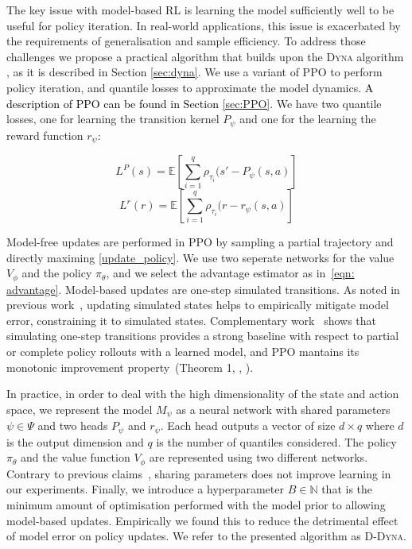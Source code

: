 \documentclass{article}
\begin{document}
        The key issue with model-based RL is learning the model sufficiently well to be useful for policy iteration. In real-world applications, this issue is exacerbated by the requirements of generalisation and sample efficiency. To address those challenges we propose a practical algorithm that builds upon the \textsc{Dyna} algorithm \cite{sutton2012dyna}, as it is described in Section \ref{sec:dyna}.
        We use a variant of PPO \cite{Schulman2017} to perform policy iteration, and quantile losses to approximate the model dynamics. \textcolor{black}{A description of PPO can be found in Section \ref{sec:PPO}}. We have two quantile losses, one for learning the transition kernel $P_\psi$ and one for the learning the reward function $r_\psi$:
       
        \begin{equation}
        	L^P(s) = \mathbb{E}[\sum_{i=1}^q \rho_{\tau_i}(s' - P_\psi(s,a)] 
        \end{equation}
        \begin{equation}
        	L^r(r) = \mathbb{E}[\sum_{i=1}^q \rho_{\tau_i}(r - r_\psi(s,a)]
        \end{equation}
        
        Model-free updates are performed in PPO by sampling a partial trajectory and directly maximing {\eqref{update_policy}}. %
        We use two seperate networks for the value $V_\phi$ and the policy $\pi_\theta$, and we select the advantage estimator as in~\eqref{eqn: advantage}. Model-based updates are one-step simulated transitions. As noted in previous work~\cite{van2019use}, updating simulated states helps to empirically mitigate model error, constraining it to simulated states. Complementary work~\cite{janner2019trust} shows that simulating one-step transitions provides a strong baseline with respect to partial or complete policy rollouts with a learned model, and PPO mantains its monotonic improvement property~(Theorem 1, \citeauthor{Schulman2015}, \citeyear{Schulman2015}).
        
        In practice, in order to deal with the high dimensionality of the state and action space, we represent the model $M_{\psi}$ as a neural network with shared parameters $\psi \in \Psi$ and two heads $P_\psi$ and $r_\psi$. Each head outputs a vector of size $d \times q$ where $d$ is the output dimension and $q$ is the number of quantiles considered.
        The policy $\pi_\theta$ and the value function $V_\phi$ are represented using two different networks. Contrary to previous claims~\cite{Schulman2017}, sharing parameters does not improve learning in our experiments.
        Finally, we introduce a hyperparameter $B \in \mathbb{N}$ that is the minimum amount of optimisation performed with the model prior to allowing model-based updates. Empirically we found this to reduce the detrimental effect of model error on policy updates. We refer to the presented algorithm as \textsc{D-Dyna}.
        
\end{document}
